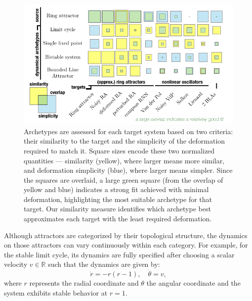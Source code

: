 \documentclass{article}
\theoremstyle{definition} \newtheorem{definition}{Definition}  \newtheorem{example}{Example}
\theoremstyle{remark} \newtheorem{remark}{Remark}
\newcounter{ct}
\newcommand{\field}[1]{\ensuremath{\mathbb{#1}}}
\newcommand{\reals}{\field{R}}
\begin{document}
\begin{figure}[t!b!hp]
    \centering
    \includegraphics[width=.9\linewidth]{archetype2target}
    \caption{Archetypes are assessed for each target system based on two criteria: their similarity to the target and the simplicity of the deformation required to match it. Square sizes encode these two normalized quantities — similarity (yellow), where larger means more similar, and deformation simplicity (blue), where larger means simpler.
     Since the squares are overlaid, a large green square (from the overlap of yellow and blue) indicates a strong fit achieved with minimal deformation, highlighting the most suitable archetype for that target.
 Our similarity measure identifies which archetype best approximates each target with the least required deformation.
    }
    \label{fig:archetype2target}
\end{figure}

Although attractors are categorized by their topological structure, the dynamics on those attractors can vary continuously within each category. For example, for the stable limit cycle, its dynamics are fully specified after choosing a scalar velocity $v\in \reals$ such that the dynamics are given by:
\begin{equation}
\dot{r} =  -r (r - 1), %
\quad \dot{\theta} = v,
\end{equation}
where \( r \) represents the radial coordinate and \( \theta \) the angular coordinate and the system exhibits stable behavior at \( r = 1 \).
\end{document}
